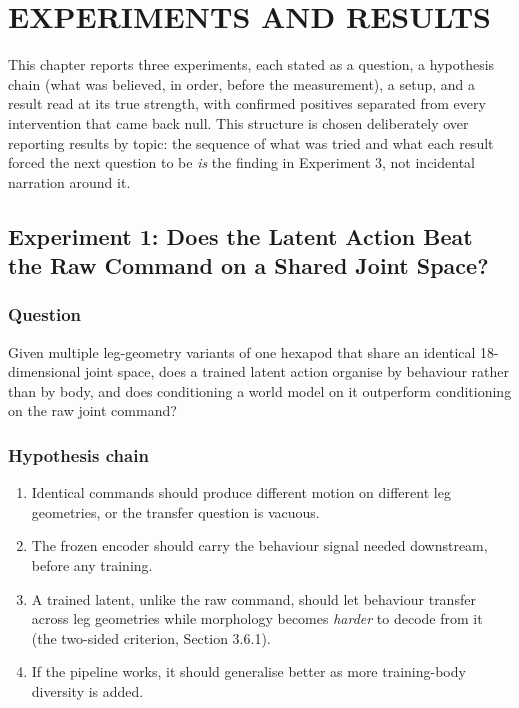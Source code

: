 \documentclass[12pt,a4paper,oneside]{report}
\begin{document}
\chapter{EXPERIMENTS AND RESULTS}

This chapter reports three experiments, each stated as a question, a hypothesis chain (what was believed, in
order, before the measurement), a setup, and a result read at its true strength, with confirmed positives separated
from every intervention that came back null. This structure is chosen deliberately over reporting results by
topic: the sequence of what was tried and what each result forced the next question to be \emph{is} the finding
in Experiment 3, not incidental narration around it.

\section{Experiment 1: Does the Latent Action Beat the Raw Command on a Shared Joint Space?}

\subsection{Question}
Given multiple leg-geometry variants of one hexapod that share an identical 18-dimensional joint space, does a
trained latent action organise by behaviour rather than by body, and does conditioning a world model on it
outperform conditioning on the raw joint command?

\subsection{Hypothesis chain}
\begin{enumerate}[label=\arabic*.]
\item Identical commands should produce different motion on different leg geometries, or the transfer question is
  vacuous.
\item The frozen encoder should carry the behaviour signal needed downstream, before any training.
\item A trained latent, unlike the raw command, should let behaviour transfer across leg geometries while
  morphology becomes \emph{harder} to decode from it (the two-sided criterion, Section 3.6.1).
\item If the pipeline works, it should generalise better as more training-body diversity is added.
\end{enumerate}
\end{document}
